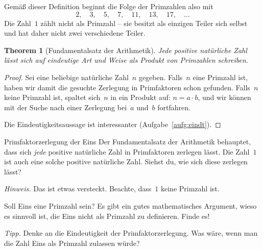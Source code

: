 \documentclass[twoside]{../zirkelblatt1415}
\theoremstyle{definition}
\theoremstyle{plain}
\newtheorem{thm}[defn]{Theorem}
\theoremstyle{remark}
\begin{document}
Gemäß dieser Definition beginnt die Folge der Primzahlen also mit
\[ 2, \quad 3, \quad 5, \quad 7, \quad 11, \quad 13, \quad 17, \quad \ldots \]
Die Zahl~$1$ zählt nicht als Primzahl -- sie besitzt als einzigen Teiler sich
selbst und hat daher nicht zwei verschiedene Teiler.

\begin{thm}[Fundamentalsatz der Arithmetik]Jede positive natürliche Zahl lässt
sich auf eindeutige Art und Weise als Produkt von Primzahlen
schreiben.\end{thm}

\begin{proof}Sei eine beliebige natürliche Zahl~$n$ gegeben. Falls~$n$ eine
Primzahl ist, haben wir damit die gesuchte Zerlegung in Primfaktoren schon
gefunden. Falls~$n$ keine Primzahl ist, spaltet sich~$n$ in ein Produkt auf: $n
= a \cdot b$, und wir können mit der Suche nach einer Zerlegung bei~$a$ und~$b$
fortfahren.

Die Eindeutigkeitsaussage ist interessanter (Aufgabe~\ref{aufg:eindt}).\end{proof}

\begin{aufgabe}{Primfaktorzerlegung der Eins}
Der Fundamentalsatz der Arithmetik behauptet, dass sich \emph{jede} positive
natürliche Zahl in Primfaktoren zerlegen lässt. Die Zahl~$1$ ist auch eine
solche positive natürliche Zahl. Siehst du, wie sich diese zerlegen lässt?

\emph{Hinweis.} Das ist etwas versteckt. Beachte, dass~$1$ keine Primzahl ist.
\end{aufgabe}

\begin{aufgabe}{Soll Eins eine Primzahl sein?}
Es gibt ein gutes mathematisches Argument, wieso es sinnvoll ist, die Eins
nicht als Primzahl zu definieren. Finde es!

\emph{Tipp.} Denke an die Eindeutigkeit der Primfaktorzerlegung. Was wäre, wenn
man die Zahl Eins als Primzahl zulassen würde?
\end{aufgabe}
\end{document}

